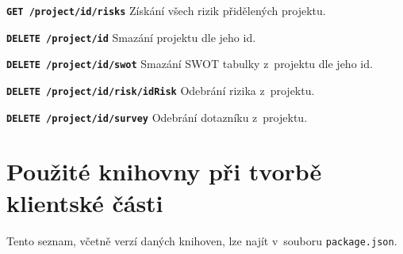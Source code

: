 \begin{DESCRIPTION}
\item \texttt{\textbf{GET /project/{id}/risks}} Získání všech rizik přidělených projektu.
\item \texttt{\textbf{DELETE /project/{id}}} Smazání projektu dle jeho id.
\item \texttt{\textbf{DELETE /project/{id}/swot}} Smazání SWOT tabulky z~projektu dle jeho id.
\item \texttt{\textbf{DELETE /project/{id}/risk/{idRisk}}} Odebrání rizika z~projektu.
\item \texttt{\textbf{DELETE /project/{id}/survey}} Odebrání dotazníku z~projektu.
\end{DESCRIPTION}

\chapter{Použité knihovny při tvorbě klientské části}

Tento seznam, včetně verzí daných knihoven, lze najít v~souboru \texttt{package.json}.

